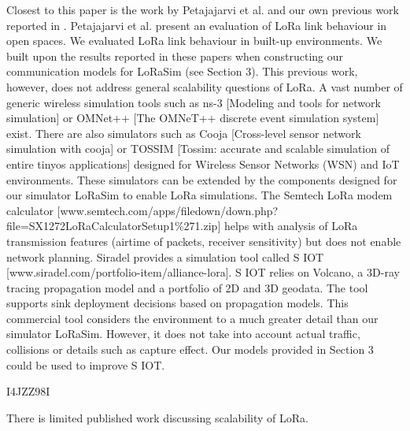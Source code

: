 Closest to this paper is the work by Petajajarvi et al.
\cite{petajajarvi_coverage_2015} and our own previous work reported in \cite{bor_lora_nodate}.
Petajajarvi et al.
present an evaluation of LoRa link behaviour in open spaces.
We evaluated LoRa link behaviour in built-up environments.
We built upon the results reported in these papers when constructing our communication models for LoRaSim (see Section 3).
This previous work,
	however,
	does not address general scalability questions of LoRa.
A vast number of generic wireless simulation tools such as ns-3 [Modeling and tools for network simulation] or OMNet++ [The OMNeT++ discrete event simulation system] exist.
There are also simulators such as Cooja [Cross-level sensor network simulation with cooja] or TOSSIM [Tossim:
	accurate and scalable simulation of entire tinyos applications] designed for Wireless Sensor Networks (WSN) and IoT environments.
These simulators can be extended by the components designed for our simulator LoRaSim to enable LoRa simulations.
The Semtech LoRa modem calculator [www.semtech.com/apps/ﬁledown/down.php? ﬁle=SX1272LoRaCalculatorSetup1\%271.zip] helps with analysis of LoRa transmission features (airtime of packets,
receiver sensitivity) but does not enable network planning.
Siradel provides a simulation tool called S IOT [www.siradel.com/portfolio-item/alliance-lora].
S IOT relies on Volcano,
	a 3D-ray tracing propagation model and a portfolio of 2D and 3D geodata.
The tool supports sink deployment decisions based on propagation models.
This commercial tool considers the environment to a much greater detail than our simulator LoRaSim.
However,
	it does not take into account actual traffic,
	collisions or details such as capture effect.
Our models provided in Section 3 could be used to improve S IOT.


\cite{bor_lora_2016} I4JZZ98I

There is limited published work discussing scalability of LoRa.

